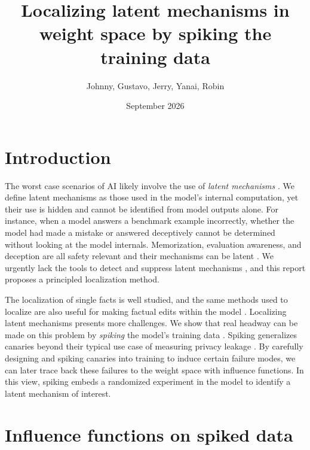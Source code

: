 \documentclass{article}
\title{Localizing latent mechanisms in weight space by spiking the training data}
\author{Johnny, Gustavo, Jerry, Yanai, Robin}
\date{September 2026}
\begin{document}
\maketitle

\section{Introduction}


The worst case scenarios of AI likely involve the use of \textit{latent mechanisms} \cite{kokotajlo2025ai2027}. We define latent mechanisms as those used in the model's internal computation, yet their use is hidden and cannot be identified from model outputs alone. For instance, when a model answers a benchmark example incorrectly, whether the model had made a mistake or answered deceptively cannot be determined without looking at the model internals. Memorization, evaluation awareness, and deception are all safety relevant and their mechanisms can be latent \cite{carlini_extracting_2021,needham2025largelanguagemodelsknow, smith2025difficultiesevaluatingdeceptiondetector}. We urgently lack the tools to detect and suppress latent mechanisms \cite{korbak2025chainthoughtmonitorabilitynew}, and this report proposes a principled localization method.

The localization of single facts is well studied, and the same methods used to localize are also useful for making factual edits within the model \cite{meng2022locating}. Localizing latent mechanisms presents more challenges. We show that real headway can be made on this problem by \textit{spiking} the model's training data \cite{wei2026statistically, wei2026correctingtestsetcontamination}. Spiking generalizes canaries beyond their typical use case of measuring privacy leakage \cite{steinke2023privacy}. By carefully designing and spiking canaries into training to induce certain failure modes, we can later trace back these failures to the weight space with influence functions. In this view, spiking embeds a randomized experiment in the model to identify a latent mechanism of interest.

\section{Influence functions on spiked data}
\end{document}

